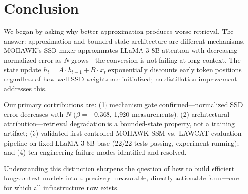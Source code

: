 \section{Conclusion}

We began by asking why better approximation produces worse retrieval. The answer: approximation
and bounded-state architecture are different mechanisms. MOHAWK's SSD mixer approximates
LLaMA-3-8B attention with decreasing normalized error as $N$ grows---the conversion is not
failing at long context. The state update $h_t = A \cdot h_{t-1} + B \cdot x_t$ exponentially
discounts early token positions regardless of how well SSD weights are initialized; no
distillation improvement addresses this.

Our primary contributions are: (1) mechanism gate confirmed---normalized SSD error decreases with
$N$ ($\beta=-0.368$, 1,920 measurements); (2) architectural attribution---retrieval degradation
is a bounded-state property, not a training artifact; (3) validated first controlled MOHAWK-SSM
vs.\ LAWCAT evaluation pipeline on fixed LLaMA-3-8B base (22/22 tests passing, experiment
running); and (4) ten engineering failure modes identified and resolved.

Understanding this distinction sharpens the question of how to build efficient long-context models
into a precisely measurable, directly actionable form---one for which all infrastructure now
exists.
